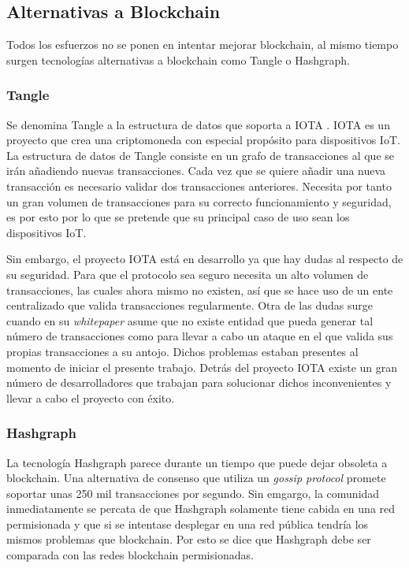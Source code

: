 \subsection{Alternativas a Blockchain}
Todos los esfuerzos no se ponen en intentar mejorar blockchain, al mismo tiempo surgen tecnologías alternativas a blockchain como Tangle o Hashgraph.

\subsubsection{Tangle}
Se denomina Tangle a la estructura de datos que soporta a IOTA \cite{tangle}. IOTA es un proyecto que crea una criptomoneda con especial propósito para dispositivos IoT. La estructura de datos de Tangle consiste en un grafo de transacciones al que se irán añadiendo nuevas transacciones. Cada vez que se quiere añadir una nueva transacción es necesario validar dos transacciones anteriores. Necesita por tanto un gran volumen de transacciones para su correcto funcionamiento y seguridad, es por esto por lo que se pretende que su principal caso de uso sean los dispositivos IoT. \newline

Sin embargo, el proyecto IOTA está en desarrollo ya que hay dudas al respecto de su seguridad. Para que el protocolo sea seguro necesita un alto volumen de transacciones, las cuales ahora mismo no existen, así que se hace uso de un ente centralizado que valida transacciones regularmente. Otra de las dudas surge cuando en su \textit{whitepaper} asume que no existe entidad que pueda generar tal número de transacciones como para llevar a cabo un ataque en el que valida sus propias transacciones a su antojo. Dichos problemas estaban presentes al momento de iniciar el presente trabajo. Detrás del proyecto IOTA existe un gran número de desarrolladores que trabajan para solucionar dichos inconvenientes y llevar a cabo el proyecto con éxito.

\subsubsection{Hashgraph}
La tecnología Hashgraph \cite{hashgraph} parece durante un tiempo que puede dejar obsoleta a blockchain. Una alternativa de consenso que utiliza un \textit{gossip protocol} promete soportar unas 250 mil transacciones por segundo. Sin emgargo, la comunidad inmediatamente se percata de que Hashgraph solamente tiene cabida en una red permisionada y que si se intentase desplegar en una red pública tendría los mismos problemas que blockchain. Por esto se dice que Hashgraph debe ser comparada con las redes blockchain permisionadas. \newline



